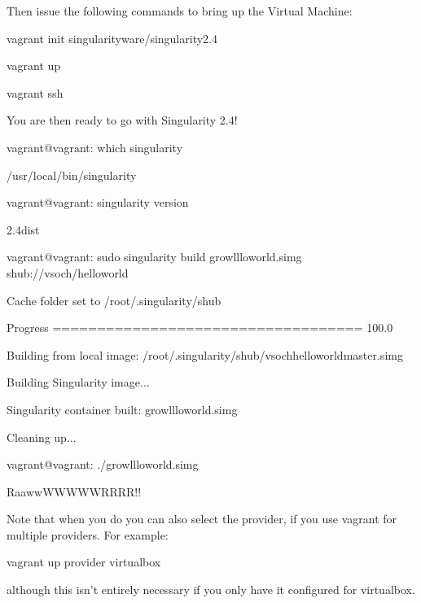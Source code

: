 \documentclass[letterpaper,10pt,english]{sphinxmanual}
\begin{document}
Then issue the following commands to bring up the Virtual Machine:

%
\begin{sphinxVerbatim}[commandchars=\\\{\}]
vagrant init singularityware/singularity\PYGZhy{}2.4

vagrant up

vagrant ssh
\end{sphinxVerbatim}

You are then ready to go with Singularity 2.4!

%
\begin{sphinxVerbatim}[commandchars=\\\{\}]
vagrant@vagrant:\PYGZti{}\PYGZdl{} which singularity

/usr/local/bin/singularity

vagrant@vagrant:\PYGZti{}\PYGZdl{} singularity \PYGZhy{}\PYGZhy{}version

2.4\PYGZhy{}dist


vagrant@vagrant:\PYGZti{}\PYGZdl{} sudo singularity build growl\PYGZhy{}llo\PYGZhy{}world.simg shub://vsoch/hello\PYGZhy{}world

Cache folder set to /root/.singularity/shub

Progress \textbar{}===================================\textbar{} 100.0\PYGZpc{}

Building from local image: /root/.singularity/shub/vsoch\PYGZhy{}hello\PYGZhy{}world\PYGZhy{}master.simg

Building Singularity image...

Singularity container built: growl\PYGZhy{}llo\PYGZhy{}world.simg

Cleaning up...

vagrant@vagrant:\PYGZti{}\PYGZdl{} ./growl\PYGZhy{}llo\PYGZhy{}world.simg

RaawwWWWWWRRRR!!
\end{sphinxVerbatim}

Note that when you do  you can also select the provider, if you use vagrant for multiple providers. For example:

%
\begin{sphinxVerbatim}[commandchars=\\\{\}]
vagrant up \PYGZhy{}\PYGZhy{}provider virtualbox
\end{sphinxVerbatim}

although this isn’t entirely necessary if you only have it configured for virtualbox.
\end{document}
